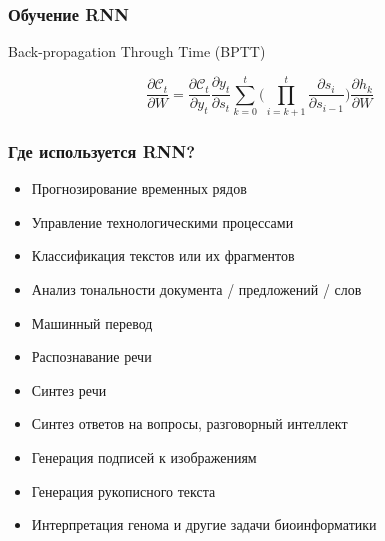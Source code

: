 \documentclass[11pt]{beamer}
\begin{document}
	\begin{frame}
		\frametitle{Обучение RNN}
		Back-propagation Through Time (BPTT)
		
		$$ \dfrac{\partial\mathcal{C}_t}{\partial W} = \dfrac{\partial\mathcal{C}_t}{\partial y_t} \dfrac{\partial y_t}{\partial s_t} \sum\limits_{k=0}^{t} \bigg(  \prod\limits_{i = k+1}^{t}  \dfrac{\partial s_i}{\partial s_{i-1}} \bigg)  \dfrac{\partial h_k}{\partial W}$$
		
		\begin{figure}[h]
		\end{figure}
		
	\end{frame}

	\begin{frame}
		\frametitle{Где используется RNN?}
		
		\begin{itemize}
			\item Прогнозирование временных рядов
			\item Управление технологическими процессами
			\item Классификация текстов или их фрагментов
			\item Анализ тональности документа / предложений / слов
			\item Машинный перевод
			\item Распознавание речи
			\item Синтез речи
			\item Синтез ответов на вопросы, разговорный интеллект
			\item Генерация подписей к изображениям
			\item Генерация рукописного текста
			\item Интерпретация генома и другие задачи биоинформатики
		\end{itemize}
		
	\end{frame}
	
\end{document}
